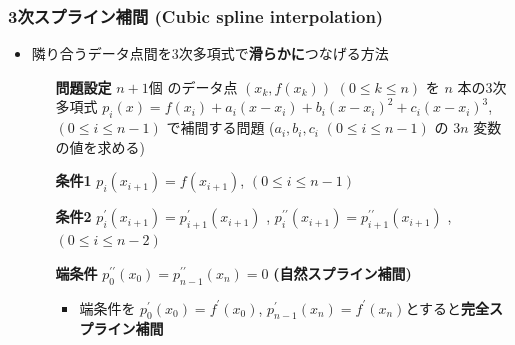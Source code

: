 \documentclass[dvipdfmx,aspectratio=169,20pt]{beamer}
\newcommand{\myfontsetting}[3]{{\fontsize{#1}{#2}\selectfont #3}}
\begin{document}
\begin{frame}
\frametitle{{\large 3次スプライン補間 \myfontsetting{12pt}{12pt}{ (Cubic spline interpolation)}}}
\begin{itemize}
    \setlength{\itemsep}{0.5cm}
    \item \myfontsetting{15pt}{15pt}{隣り合うデータ点間を3次多項式で{\bf 滑らかに}つなげる方法}
    \begin{itemize}
        \item [\myfontsetting{12pt}{12pt}{\bf 問題設定}] \myfontsetting{12pt}{12pt}{ $n+1$個 のデータ点 $(x_k, f(x_k))$ \myfontsetting{10pt}{10pt}{ $(0\le k\le n)$} を $n$ 本の3次多項式 \myfontsetting{12pt}{12pt}{$p_i(x) = f(x_i) + a_i (x-x_i) + b_i (x-x_i)^2 + c_i (x-x_i)^3$}, \myfontsetting{10pt}{10pt}{$(0 \le i \le n-1)$} で補間する問題 ($a_i, b_i, c_i$ \myfontsetting{10pt}{10pt}{$(0 \le i \le n-1)$} の $3n$ 変数の値を求める)
        }
        \item [\myfontsetting{12pt}{12pt}{\bf 条件1}] \myfontsetting{12pt}{12pt}{$p_i(x_{i+1}) = f(x_{i+1})$, \myfontsetting{10pt}{10pt}{$(0\le i \le n-1)$}}
        \item [\myfontsetting{12pt}{12pt}{\bf 条件2}] \myfontsetting{12pt}{12pt}{$p_i^\prime(x_{i+1}) = p_{i+1}^\prime(x_{i+1})$ , $p_i^{\prime\prime}(x_{i+1}) = p_{i+1}^{\prime\prime}(x_{i+1})$} , \myfontsetting{10pt}{10pt}{$(0\le i \le n-2)$}
        \item [\myfontsetting{12pt}{12pt}{\bf 端条件}] \myfontsetting{12pt}{12pt}{$p_0^{\prime\prime}(x_0)=p_{n-1}^{\prime\prime}(x_n)=0$ \myfontsetting{8pt}{8pt}{\bf (自然スプライン補間)}}
        \begin{itemize}
            \item \myfontsetting{10pt}{10pt}{ 端条件を \myfontsetting{8pt}{8pt}{$p_0^{\prime}(x_0)=f^\prime(x_0)$, $p_{n-1}^{\prime}(x_n)=f^\prime(x_n)$}とすると{\bf 完全スプライン補間}}
        \end{itemize}
    \end{itemize}
\end{itemize}
\end{frame}
\end{document}
